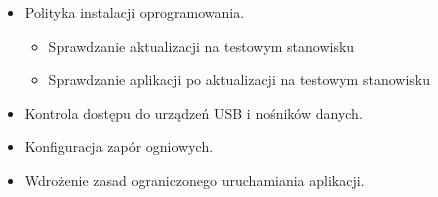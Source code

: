 \begin{itemize}
    \item Polityka instalacji oprogramowania.
    \begin{itemize}
        \item {Sprawdzanie aktualizacji na testowym stanowisku}
        \item {Sprawdzanie aplikacji po aktualizacji na testowym stanowisku}
    \end{itemize}
    
    \item Kontrola dostępu do urządzeń USB i nośników danych.
    \item Konfiguracja zapór ogniowych.
    \item Wdrożenie zasad ograniczonego uruchamiania aplikacji.
\end{itemize}